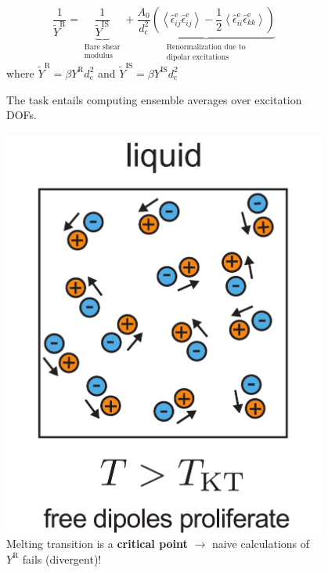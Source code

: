 \begin{frame}[c]
\begin{columns}
\begin{column}{0.55\linewidth}
\end{column}

\begin{column}{0.45\linewidth}

\begin{overprint}
\begin{figure}
\vspace{30pt}
$$ \frac{1}{\tilde{Y}^{\mathrm{R}} }= \underbrace{\frac{1}{\tilde{Y}^{\mathrm{IS}}}}_{\substack{\text{Bare shear} \\ \text{modulus}}}+\underbrace{\frac{A_{0}}{d_{\mathrm{c}}^{2}}\left(\left\langle\hat{\epsilon}_{i j}^{\mathrm{e}} \hat{\epsilon}_{i j}^{\mathrm{e}}\right\rangle-\frac{1}{2}\left\langle\hat{\epsilon}_{i i}^{\mathrm{e}} \hat{\epsilon}_{k k}^{\mathrm{e}}\right\rangle\right)}_{\substack{\text{Renormalization due to} \\ \text{dipolar excitations}}} $$
where $\tilde{Y}^\mathrm{R} = \beta Y^\mathrm{R} d_\mathrm{c}^2$ and $\tilde{Y}^\mathrm{IS} = \beta Y^\mathrm{IS} d_\mathrm{c}^2$

\caption{The task entails computing ensemble averages over excitation DOFs.} 

    
\end{figure}

\begin{figure}
\centering\includegraphics[height=0.675\textheight]{c.8-kt_results_1/new-mechanism-0.pdf}\caption{Melting transition is a \textbf{critical point} $\to$ naive calculations of $Y^\mathrm{R}$ fails (divergent)!}
\end{figure}


\end{overprint}
\end{column}
\end{columns}
\end{frame}
